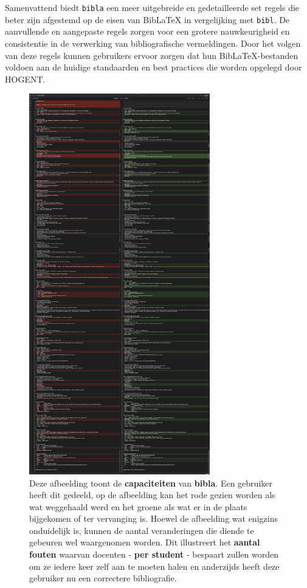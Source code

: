 Samenvattend biedt \texttt{bibla} een meer uitgebreide en gedetailleerde set regels die beter zijn afgestemd op de eisen van BibLaTeX in vergelijking met \texttt{bibl}. De aanvullende en aangepaste regels zorgen voor een grotere nauwkeurigheid en consistentie in de verwerking van bibliografische vermeldingen. Door het volgen van deze regels kunnen gebruikers ervoor zorgen dat hun BibLaTeX-bestanden voldoen aan de huidige standaarden en best practices die worden opgelegd door HOGENT.

\begin{figure}[ht]
    \centering
    \includegraphics[width=0.7\textwidth]{./files/bibla_is_useful.jpeg}
    \caption[Effectiviteit bibla]{Deze afbeelding toont de \textbf{capaciteiten} van \textbf{bibla}. Een gebruiker heeft dit gedeeld, op de afbeelding kan het rode gezien worden als wat weggehaald werd en het groene als wat er in de plaats bijgekomen of ter vervanging is. Hoewel de afbeelding wat enigzins onduidelijk is, kunnen de aantal veranderingen die diende te gebeuren wel waargenomen worden. Dit illustreert het \textbf{aantal fouten} waarvan docenten - \textbf{per student} - bespaart zullen worden om ze iedere keer zelf aan te moeten halen en anderzijds heeft deze gebruiker nu een correctere bibliografie.}
    \label{fig:bibla-is-useful}
\end{figure}


